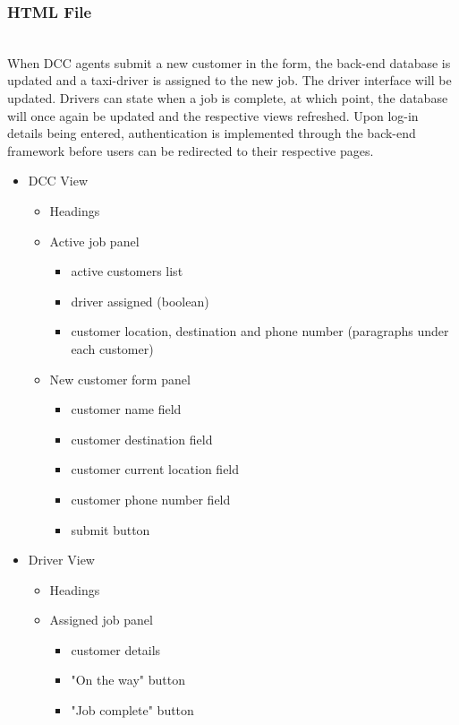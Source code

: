 \documentclass[10pt, onecolumn]{witseiepaper}
\begin{document}
\subsubsection{HTML File}\mbox{}\\

When DCC agents submit a new customer in the form, the back-end database is updated and a taxi-driver is assigned to the new job. The driver interface will be updated. Drivers can state when a job is complete, at which point, the database will once again be updated and the respective views refreshed. Upon log-in details being entered, authentication is implemented through the back-end framework before users can be redirected to their respective pages.
\begin{itemize}
\item DCC View
\begin{itemize}
\item Headings\\
\item Active job panel
\begin{itemize}
\item active customers list
\item driver assigned (boolean)
\item customer location, destination and phone number (paragraphs under each customer)\\
\end{itemize}
\item New customer form panel
\begin{itemize}
\item customer name field
\item customer destination field
\item customer current location field
\item customer phone number field
\item submit button \\
\end{itemize}
\end{itemize} 
\item Driver View
\begin{itemize}
\item Headings\\
\item Assigned job panel
\begin{itemize}
\item customer details
\item "On the way" button
\item "Job complete" button\\

\end{itemize}
\end{itemize}
\end{itemize}
\end{document}
